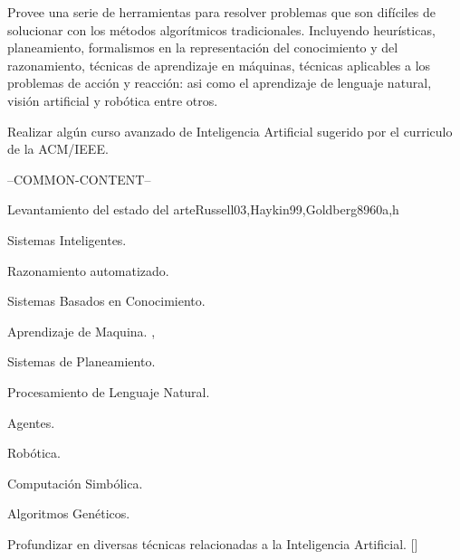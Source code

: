 \begin{syllabus}

\begin{justification}
Provee una serie de herramientas para resolver problemas que son difíciles de solucionar con los métodos algorítmicos tradicionales. Incluyendo heurísticas, planeamiento, formalismos en la representación del conocimiento y del razonamiento, técnicas de aprendizaje en máquinas, técnicas aplicables a los problemas de acción y reacción: asi como el aprendizaje de lenguaje natural, visión artificial y robótica entre otros. 
\end{justification}

\begin{goals}
\item Realizar algún curso avanzado de Inteligencia Artificial sugerido por el curriculo de la ACM/IEEE.
\end{goals}

--COMMON-CONTENT--

\begin{unit}{}{Levantamiento del estado del arte}{Russell03,Haykin99,Goldberg89}{60}{a,h}
\begin{topics}
  \item Sistemas Inteligentes.
  \item Razonamiento automatizado.
  \item Sistemas Basados en Conocimiento.
  \item Aprendizaje de Maquina. \cite{Russell03},\cite{Haykin99}
  \item Sistemas de Planeamiento.
  \item Procesamiento de Lenguaje Natural.
  \item Agentes.
  \item Robótica.
  \item Computación Simbólica.
  \item Algoritmos Genéticos. \cite{Goldberg89}
\end{topics}
\begin{learningoutcomes}
  \item Profundizar en diversas técnicas relacionadas a la Inteligencia Artificial. [\Usage]
\end{learningoutcomes}
\end{unit}

\begin{coursebibliography}
\end{coursebibliography}

\end{syllabus}
